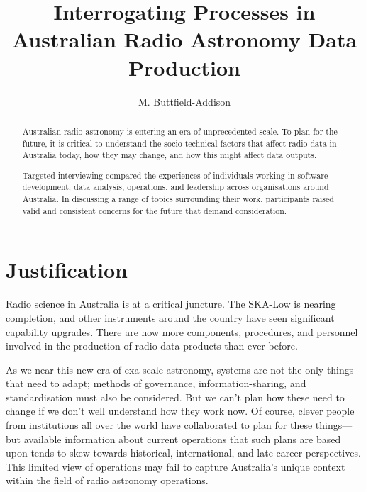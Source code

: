 \documentclass[11pt,twoside]{article}
\begin{document}
\title{Interrogating Processes in Australian Radio Astronomy Data Production}

\author{M. Buttfield-Addison}



\begin{abstract}
Australian radio astronomy is entering an era of unprecedented scale. To plan for the future, it is critical to understand the socio-technical factors that affect radio data in Australia today, how they may change, and how this might affect data outputs.

Targeted interviewing compared the experiences of individuals working in software development, data analysis, operations, and leadership across organisations around Australia. In discussing a range of topics surrounding their work, participants raised valid and consistent concerns for the future that demand consideration.
\end{abstract}


\section{Justification}

Radio science in Australia is at a critical juncture. The SKA-Low is nearing completion, and other instruments around the country have seen significant capability upgrades. There are now more components, procedures, and personnel involved in the production of radio data products than ever before.

As we near this new era of exa-scale astronomy, systems are not the only things that need to adapt; methods of governance, information-sharing, and standardisation must also be considered. But we can't plan how these need to change if we don't well understand how they work now. Of course, clever people from institutions all over the world have collaborated to plan for these things---but available information about current operations that such plans are based upon tends to skew towards historical, international, and late-career perspectives. This limited view of operations may fail to capture Australia's unique context within the field of radio astronomy operations.
\end{document}
